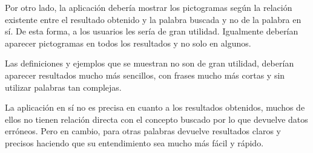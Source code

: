 Por otro lado, la aplicación debería mostrar los pictogramas según la relación existente entre el resultado obtenido y la palabra buscada y no de la palabra en sí. De esta forma, a los usuarios les sería de gran utilidad.
Igualmente deberían aparecer pictogramas en todos los resultados y no solo en algunos.

Las definiciones y ejemplos que se muestran no son de gran utilidad, deberían aparecer resultados mucho más sencillos, con frases mucho más cortas y sin utilizar palabras tan complejas.

La aplicación en sí no es precisa en cuanto a los resultados obtenidos, muchos de ellos no tienen relación directa con el concepto buscado por lo que devuelve datos erróneos. Pero en cambio, para otras palabras devuelve resultados claros y precisos haciendo que su entendimiento sea mucho más fácil y rápido.

